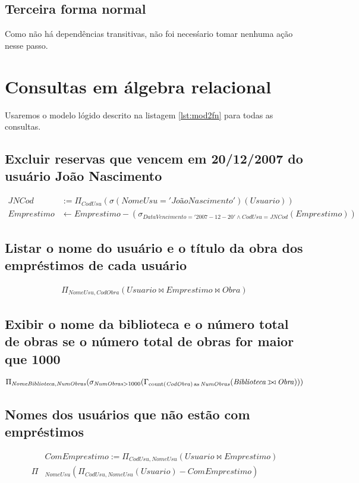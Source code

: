 \documentclass[12pt]{article}
\def\ojoin{\setbox0=\hbox{$\bowtie$}%
  \rule[-.02ex]{.25em}{.4pt}\llap{\rule[\ht0]{.25em}{.4pt}}}
\def\leftouterjoin{\mathbin{\ojoin\mkern-5.8mu\bowtie}}
\begin{document}
  \subsection{Terceira forma normal}
  Como não há dependências transitivas, não foi necesśario tomar nenhuma ação nesse passo.

\section{Consultas em álgebra relacional}
Usaremos o modelo lógido descrito na listagem \ref{lst:mod2fn} para todas as consultas.

  \subsection{Excluir reservas que vencem em 20/12/2007 do usuário João Nascimento}
    \begin{align*}
\mathit{JNCod} &:= \Pi_{\mathit{CodUsu}}(\sigma(\mathit{NomeUsu} = \mathit{'João Nascimento'})(\mathit{Usuario})) \\
\mathit{Emprestimo} &\gets \mathit{Emprestimo} - (\sigma_{\mathit{DataVencimento} = \mathit{'2007-12-20'} \land \mathit{CodUsu} = \mathit{JNCod}}(\mathit{Emprestimo}))
    \end{align*}
  \subsection{Listar o nome do usuário e o título da obra dos empréstimos de cada usuário}
    \begin{align*}
\Pi_{\mathit{NomeUsu, CodObra}}(\mathit{Usuario} \bowtie \mathit{Emprestimo} \bowtie \mathit{Obra})
    \end{align*}
  \subsection{Exibir o nome da biblioteca e o número total de obras se o número total de obras for maior que 1000}
    \begin{align*}
\Pi_{\mathit{NomeBiblioteca}, \mathit{NumObras}}(\sigma_{\mathit{NumObras} > 1000}(\Gamma_{\operatorname{count}(\mathit{CodObra}) \operatorname{as} \mathit{NumObras}}(\mathit{Biblioteca} \leftouterjoin \mathit{Obra})))
    \end{align*}
  \subsection{Nomes dos usuários que não estão com empréstimos}
    \begin{align*}
      &\mathit{ComEmprestimo} := \Pi_{\mathit{CodUsu}, \mathit{NomeUsu}}(\mathit{Usuario} \bowtie \mathit{Emprestimo}) \\
      \Pi&_{\mathit{NomeUsu}}(\Pi_{\mathit{CodUsu}, \mathit{NomeUsu}}(\mathit{Usuario}) - \mathit{ComEmprestimo})
    \end{align*}
\end{document}
